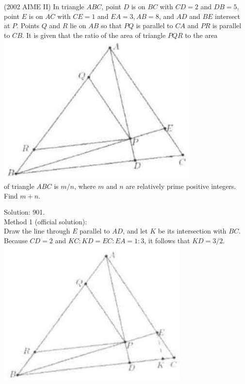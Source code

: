 \documentclass{article}
\begin{document}
(2002 AIME II) In triangle \(A B C\), point \(D\) is on \(B C\) with \(C D=2\) and \(D B=5\), point \(E\) is on \(A C\) with \(C E=1\) and \(E A=3, A B=8\), and \(A D\) and \(B E\) intersect at \(P\). Points \(Q\) and \(R\) lie on \(A B\) so that \(P Q\) is parallel to \(C A\) and \(P R\) is parallel to \(C B\). It is given that the ratio of the area of triangle \(P Q R\) to the area\\
\centering
\includegraphics[width=\textwidth]{images/121(2).jpg}\\
of triangle \(A B C\) is \(m / n\), where \(m\) and \(n\) are relatively prime positive integers. Find \(m+n\).

Solution: 901.\\
Method 1 (official solution):\\
Draw the line through \(E\) parallel to \(A D\), and let \(K\) be its intersection with \(B C\).\\
Because \(C D=2\) and \(K C: K D=E C: E A=1: 3\), it follows that \(K D=3 / 2\).\\
\centering
\includegraphics[width=\textwidth]{images/122.jpg}
\end{document}
